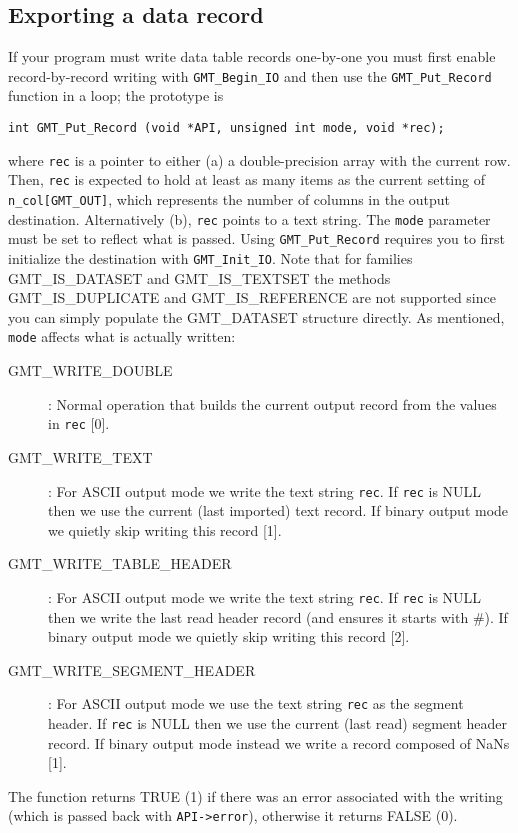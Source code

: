 \documentclass[11pt]{report}
\begin{document}
\subsection{Exporting a data record}

If your program must write data table records one-by-one you must first enable record-by-record
writing with \texttt{GMT\_Begin\_IO} and then use the \texttt{GMT\_Put\_Record} function in a loop;
the prototype is

\begin{verbatim}
int GMT_Put_Record (void *API, unsigned int mode, void *rec);
\end{verbatim}
where \texttt{rec} is a pointer to either (a) a double-precision array with the current row.
Then, \texttt{rec} is expected to hold at least as many items as the current setting of
\texttt{n\_col[GMT\_OUT]}, which represents the number of columns in the output destination.
Alternatively (b), \texttt{rec} points to a text string.
The \texttt{mode} parameter must be set to reflect what is passed.  Using \texttt{GMT\_Put\_Record}
requires you to first initialize the destination with \texttt{GMT\_Init\_IO}.
Note that for families GMT\_IS\_DATASET and GMT\_IS\_TEXTSET the methods GMT\_IS\_DUPLICATE and GMT\_IS\_REFERENCE are not supported since
you can simply populate the GMT\_DATASET structure directly.
As mentioned, \texttt{mode} affects what is actually written:
\begin{description}
\item [GMT\_WRITE\_DOUBLE]: Normal operation that builds the current output record from
the values in \texttt{rec} [0].
\item [GMT\_WRITE\_TEXT]: For ASCII output mode we write the text string \texttt{rec}.
If \texttt{rec} is NULL then we use the current (last imported) text record.
If binary output mode we quietly skip writing this record [1].
\item [GMT\_WRITE\_TABLE\_HEADER]: For ASCII output mode we write the text string \texttt{rec}.
If \texttt{rec} is NULL then we write the last read
header record (and ensures it starts with \#). If binary output mode we quietly skip writing this record [2].
\item [GMT\_WRITE\_SEGMENT\_HEADER]: For ASCII output mode we use the text string \texttt{rec} as the segment header.
If \texttt{rec} is NULL then we use the current (last read) segment header record.
If binary output mode instead we write a record composed of NaNs [1].
\end{description}
The function returns TRUE (1) if there was an error associated with the writing (which is passed back with \texttt{API->error}),
otherwise it returns FALSE (0).
\end{document}
